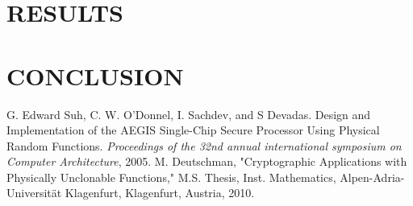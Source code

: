 \documentclass[letterpaper, 10 pt, conference]{ieeeconf}  %
\begin{document}
\section{RESULTS}
 

\section{CONCLUSION}


\addtolength{\textheight}{-12cm}   %

















\begin{thebibliography}{99}

 G. Edward Suh, C. W. O'Donnel, I. Sachdev, and S Devadas. Design and Implementation of the AEGIS Single-Chip Secure Processor Using Physical Random Functions. \emph{Proceedings of the 32nd annual international symposium on Computer Architecture}, 2005.
 M. Deutschman, "Cryptographic Applications with Physically Unclonable Functions," M.S. Thesis, Inst. Mathematics, Alpen-Adria-Universit\"{a}t Klagenfurt, Klagenfurt, Austria, 2010.
 

\end{thebibliography}
\end{document}
